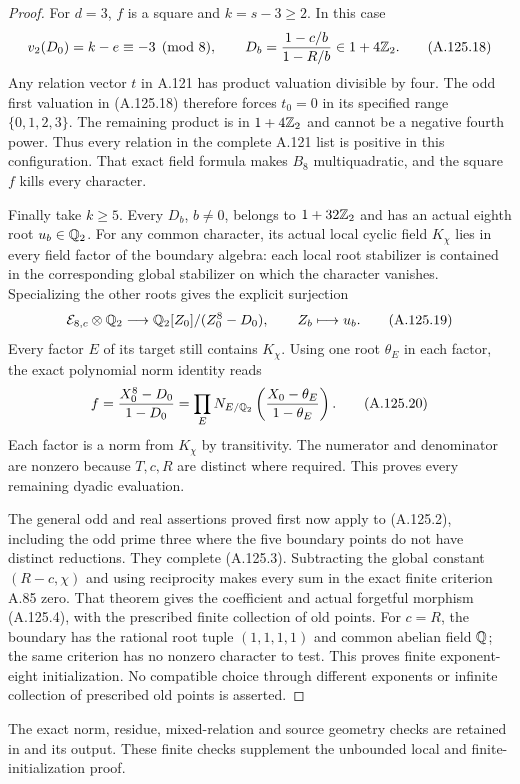 \begin{proof}
For $d=3$, $f$ is a square and $k=s-3\ge2$.
In this case
\[
       v_2(D_0)=k-e\equiv-3\pmod8,\qquad
       D_b=\frac{1-c/b}{1-R/b}\in1+4\mathbb Z_2.
\tag{A.125.18}
\]
Any relation vector $t$ in A.121 has product
valuation divisible by four.
The odd first valuation in (A.125.18) therefore
forces $t_0=0$ in its specified range
$\{0,1,2,3\}$.
The remaining product is in $1+4\mathbb Z_2$ and cannot
be a negative fourth power.
Thus every relation in the complete A.121 list is
positive in this configuration.
That exact field formula makes $B_8$ multiquadratic,
and the square $f$ kills every character.

Finally take $k\ge5$.
Every $D_b$, $b\ne0$, belongs to $1+32\mathbb Z_2$ and
has an actual eighth root $u_b\in\mathbb Q_2$.
For any common character, its actual local cyclic
field $K_\chi$ lies in every field factor of the
boundary algebra: each local root stabilizer is
contained in the corresponding global stabilizer
on which the character vanishes.
Specializing the other roots gives the explicit
surjection
\[
 \mathcal E_{8,c}\otimes\mathbb Q_2
       \longrightarrow\mathbb Q_2[Z_0]/(Z_0^8-D_0),
                         \qquad Z_b\longmapsto u_b.
\tag{A.125.19}
\]
Every factor $E$ of its target still contains
$K_\chi$.
Using one root $\theta_E$ in each factor, the exact
polynomial norm identity reads
\[
 f=\frac{X_0^8-D_0}{1-D_0}
   =\prod_E N_{E/\mathbb Q_2}
                    \left(\frac{X_0-\theta_E}{1-\theta_E}\right).
\tag{A.125.20}
\]
Each factor is a norm from $K_\chi$ by transitivity.
The numerator and denominator are nonzero because
$T,c,R$ are distinct where required.
This proves every remaining dyadic evaluation.

The general odd and real assertions proved first
now apply to (A.125.2), including the odd prime
three where the five boundary points do not have
distinct reductions.
They complete (A.125.3).
Subtracting the global constant $(R-c,\chi)$ and
using reciprocity makes every sum in the exact
finite criterion A.85 zero.
That theorem gives the coefficient and actual
forgetful morphism (A.125.4), with the prescribed
finite collection of old points.
For $c=R$, the boundary has the rational root tuple
$(1,1,1,1)$ and common abelian field $\mathbb Q$; the
same criterion has no nonzero character to test.
This proves finite exponent-eight initialization.
No compatible choice through different exponents
or infinite collection of prescribed old points
is asserted.
\end{proof}

The exact norm, residue, mixed-relation and source
geometry checks are retained in
and its output.  These finite checks supplement
the unbounded local and finite-initialization proof.
